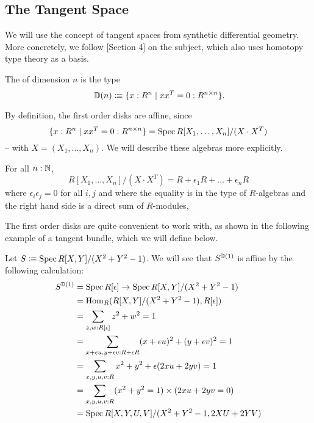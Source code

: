 \subsection{The Tangent Space}

We will use the concept of tangent spaces from synthetic differential geometry.
More concretely, we follow \cite{david-orbifolds}[Section 4]
on the subject, which also uses homotopy type theory as a basis.

\begin{definition}
  The  of dimension $n$ is the type
  \[ \D(n)\colonequiv \{x:R^n \mid xx^T = 0 : R^{n \times n}\}\rlap{.}\]
\end{definition}

By definition, the first order disks are affine, since
\[
  \{x:R^n \mid xx^T = 0 : R^{n \times n}\} = \operatorname{Spec} R[X_1,\dots,X_n]/(X\cdot X^T)
\]
-- with $X=(X_1,\dots,X_n)$.
We will describe these algebras more explicitly.

\begin{lemma}%
  For all $n:\mathbb{N}$,
  \[
    R[X_1,\dots,X_n]/(X\cdot X^T) = R+\epsilon_1R+\dots+\epsilon_nR
  \]
  where $\epsilon_i\epsilon_j=0$ for all $i,j$ and
  where the equality is in the type of $R$-algebras and the right hand side is a direct sum of $R$-modules,
\end{lemma}

The first order disks are quite convenient to work with,
as shown in the following example of a tangent bundle,
which we will define below.

\begin{example}%
  Let $S\vcentcolon\mspace{-1.2mu}\equiv\operatorname{Spec} R[X,Y]/(X^2+Y^2-1)$.
  We will see that $S^{\mathbb{D}(1)}$ is affine by the following calculation:
  \begin{align*}
    S^{\mathbb{D}(1)} &= \operatorname{Spec} R[\epsilon] \to \operatorname{Spec} R[X,Y]/(X^2+Y^2-1) \\
              &= \mathrm{Hom}_R(R[X,Y]/(X^2+Y^2-1), R[\epsilon]) \\
              &= \sum_{z,w:R[\epsilon]}z^2+w^2=1 \\
              &= \sum_{x+\epsilon u, y+\epsilon v:R+\epsilon R}(x+\epsilon u)^2+(y+\epsilon v)^2=1 \\
              &= \sum_{x,y,u,v:R} x^2+y^2+\epsilon (2xu+2yv)=1 \\
              &=\sum_{x,y,u,v:R}(x^2+y^2=1)\times(2xu+2yv=0) \\
    &=\operatorname{Spec} R[X,Y,U,V]/(X^2+Y^2-1,2XU+2YV)
  \end{align*}
\end{example}

